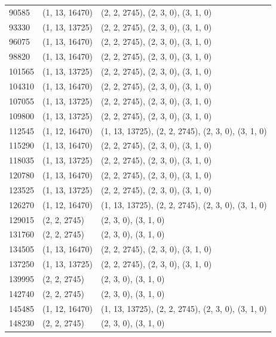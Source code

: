 \begin{longtable}{@{\extracolsep{\fill}}lll}
90585  & (1, 13, 16470) & (2, 2, 2745), (2, 3, 0), (3, 1, 0)                  \\
93330  & (1, 13, 13725) & (2, 2, 2745), (2, 3, 0), (3, 1, 0)                  \\
96075  & (1, 13, 16470) & (2, 2, 2745), (2, 3, 0), (3, 1, 0)                  \\
98820  & (1, 13, 16470) & (2, 2, 2745), (2, 3, 0), (3, 1, 0)                  \\
101565 & (1, 13, 13725) & (2, 2, 2745), (2, 3, 0), (3, 1, 0)                  \\
104310 & (1, 13, 16470) & (2, 2, 2745), (2, 3, 0), (3, 1, 0)                  \\
107055 & (1, 13, 13725) & (2, 2, 2745), (2, 3, 0), (3, 1, 0)                  \\
109800 & (1, 13, 13725) & (2, 2, 2745), (2, 3, 0), (3, 1, 0)                  \\
112545 & (1, 12, 16470) & (1, 13, 13725), (2, 2, 2745), (2, 3, 0), (3, 1, 0)  \\
115290 & (1, 13, 16470) & (2, 2, 2745), (2, 3, 0), (3, 1, 0)                  \\
118035 & (1, 13, 13725) & (2, 2, 2745), (2, 3, 0), (3, 1, 0)                  \\
120780 & (1, 13, 16470) & (2, 2, 2745), (2, 3, 0), (3, 1, 0)                  \\
123525 & (1, 13, 13725) & (2, 2, 2745), (2, 3, 0), (3, 1, 0)                  \\
126270 & (1, 12, 16470) & (1, 13, 13725), (2, 2, 2745), (2, 3, 0), (3, 1, 0)  \\
129015 & (2, 2, 2745)   & (2, 3, 0), (3, 1, 0)                                \\
131760 & (2, 2, 2745)   & (2, 3, 0), (3, 1, 0)                                \\
134505 & (1, 13, 16470) & (2, 2, 2745), (2, 3, 0), (3, 1, 0)                  \\
137250 & (1, 13, 13725) & (2, 2, 2745), (2, 3, 0), (3, 1, 0)                  \\
139995 & (2, 2, 2745)   & (2, 3, 0), (3, 1, 0)                                \\
142740 & (2, 2, 2745)   & (2, 3, 0), (3, 1, 0)                                \\
145485 & (1, 12, 16470) & (1, 13, 13725), (2, 2, 2745), (2, 3, 0), (3, 1, 0)  \\
148230 & (2, 2, 2745)   & (2, 3, 0), (3, 1, 0)                                \\

\end{longtable}
